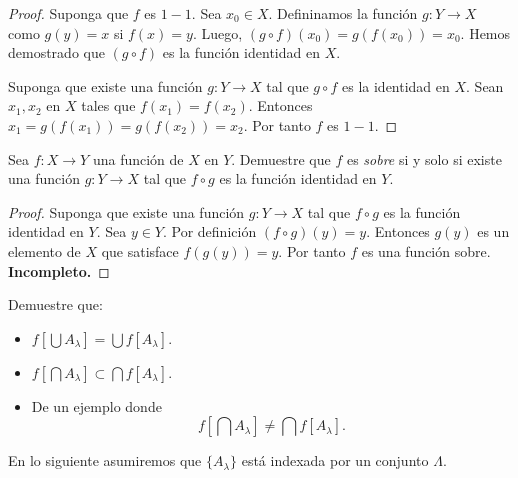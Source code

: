 \documentclass[12pt]{article}
\newenvironment{problem}[2][Problema]{\begin{trivlist}
\item[\hskip \labelsep {\bfseries #1}\hskip \labelsep {\bfseries #2.}]}{\end{trivlist}}
\begin{document}
\begin{proof}
 Suponga que $f$ es $1-1$. Sea $x_0 \in X$. Defininamos la función $g: Y \rightarrow X$ como $g(y) = x$ si $f(x) = y$. Luego, $(g \circ f)(x_0) = g(f(x_0)) = x_0 $.  Hemos demostrado que $(g \circ f)$ es la función identidad en $X$.

Suponga que existe una función $g: Y \rightarrow X$ tal que $g \circ f$ es la identidad en $X$. Sean $x_1, x_2$ en $X$ tales que $f(x_1) = f(x_2)$. Entonces $x_1 = g(f(x_1)) = g(f(x_2)) = x_2$. Por tanto $f$ es $1-1$.
\end{proof}
\text{ }
\begin{problem}{7}
Sea $f: X \rightarrow Y$ una función de $X$ en $Y$. Demuestre que $f$ es \textit{sobre} si y solo si existe una función $g: Y \rightarrow X$ tal que $f \circ g$ es la función identidad en $Y$. 
\end{problem}

\begin{proof}
Suponga que existe una función $g: Y \rightarrow X$ tal que $f \circ g$ es la función identidad en $Y$. Sea $y \in Y$. Por definición $(f \circ g)(y) = y$. Entonces $g(y)$ es un elemento de $X$ que satisface  $f(g(y)) = y$. Por tanto $f$ es una función sobre. \textbf{Incompleto.}
\end{proof}
\text{ }

\begin{problem}{16} Demuestre que:
\begin{itemize}
    \item [a)] $f[\bigcup A_\lambda ] = \bigcup f[A_\lambda]$.
    \item [b)] $f[\bigcap A_\lambda ] \subset \bigcap f[A_\lambda]$.
    \item[c)] De un ejemplo donde 
    $$f[\bigcap A_\lambda ] \neq \bigcap f[A_\lambda].$$
\end{itemize}

\end{problem}
En lo siguiente asumiremos que $\{A_\lambda\}$ está indexada por un conjunto $\Lambda$.
\end{document}
